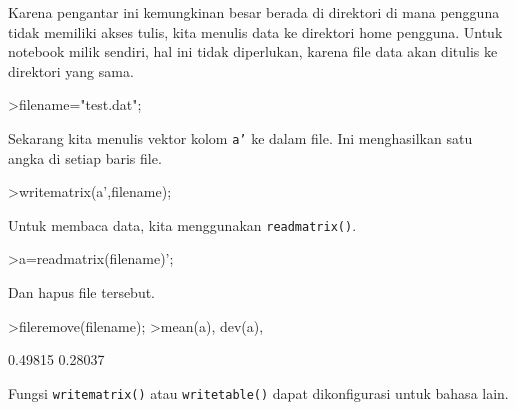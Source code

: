 \documentclass[a4paper,11pt,oneside,enabledeprecatedfontcommands]{scrbook}
\newenvironment{eulernotebook}{}{}
\newenvironment{eulercomment}{\par\medskip\noindent}{\par\medskip}
\begin{document}
\begin{eulernotebook}
\begin{eulercomment}
			Karena pengantar ini kemungkinan besar berada di direktori di mana pengguna tidak memiliki akses
			tulis, kita menulis data ke direktori home pengguna. Untuk notebook milik sendiri, hal ini tidak
			diperlukan, karena file data akan ditulis ke direktori yang sama.
		\end{eulercomment}
		\begin{eulerprompt}
			>filename="test.dat";
		\end{eulerprompt}
		\begin{eulercomment}
			Sekarang kita menulis vektor kolom \texttt{a'} ke dalam file. Ini menghasilkan satu angka di setiap baris
			file.
		\end{eulercomment}
		\begin{eulerprompt}
			>writematrix(a',filename);
		\end{eulerprompt}
		\begin{eulercomment}
			Untuk membaca data, kita menggunakan \texttt{readmatrix()}.
		\end{eulercomment}
		\begin{eulerprompt}
			>a=readmatrix(filename)';
		\end{eulerprompt}
		\begin{eulercomment}
			Dan hapus file tersebut.
		\end{eulercomment}
		\begin{eulerprompt}
			>fileremove(filename);
			>mean(a), dev(a),
		\end{eulerprompt}
		\begin{euleroutput}
			0.49815
			0.28037
		\end{euleroutput}
		\begin{eulercomment}
			Fungsi \texttt{writematrix()} atau \texttt{writetable()} dapat dikonfigurasi untuk bahasa lain.
			

\end{eulercomment}
\end{eulernotebook}
\end{document}
